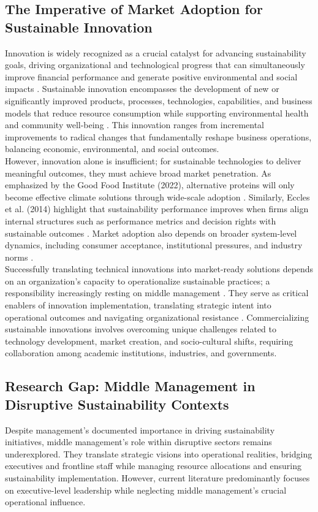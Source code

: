 	\subsection{The Imperative of Market Adoption for Sustainable Innovation}
	Innovation is widely recognized as a crucial catalyst for advancing sustainability goals, driving organizational and technological progress that can simultaneously improve financial performance and generate positive environmental and social impacts \cite{Boons2013, Schiederig2012}. Sustainable innovation encompasses the development of new or significantly improved products, processes, technologies, capabilities, and business models that reduce resource consumption while supporting environmental health and community well-being \cite{Adams2016}. This innovation ranges from incremental improvements to radical changes that fundamentally reshape business operations, balancing economic, environmental, and social outcomes. \\ 
	
	However, innovation alone is insufficient; for sustainable technologies to deliver meaningful outcomes, they must achieve broad market penetration. As emphasized by the Good Food Institute (2022), alternative proteins will only become effective climate solutions through wide-scale adoption \cite{gfi2022}. Similarly, Eccles et al. (2014) highlight that sustainability performance improves when firms align internal structures such as performance metrics and decision rights with sustainable outcomes \cite{Eccles2014}. Market adoption also depends on broader system-level dynamics, including consumer acceptance, institutional pressures, and industry norms \cite{Hall2003, Geels2002}. \\
	
	Successfully translating technical innovations into market-ready solutions depends on an organization’s capacity to operationalize sustainable practices; a responsibility increasingly resting on middle management \cite{Rafaeli2022}. They serve as critical enablers of innovation implementation, translating strategic intent into operational outcomes and navigating organizational resistance \cite{birkinshaw2004}. Commercializing sustainable innovations involves overcoming unique challenges related to technology development, market creation, and socio-cultural shifts, requiring collaboration among academic institutions, industries, and governments. \\
	
	\subsection{Research Gap: Middle Management in Disruptive Sustainability Contexts}
	Despite management’s documented importance in driving sustainability initiatives, middle management’s role within disruptive sectors remains underexplored. They translate strategic visions into operational realities, bridging executives and frontline staff while managing resource allocations and ensuring sustainability implementation. However, current literature predominantly focuses on executive-level leadership while neglecting middle management’s crucial operational influence. \\
	
